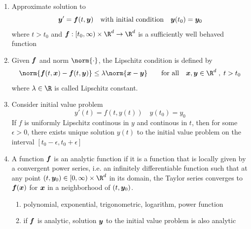 \documentclass[11pt]{article}
\begin{document}
\subsection{}


\begin{enumerate}
    \item {} Approximate solution to 
    \[
        \by' = \bf ( t, \by)
        \quad \text{with initial condition} \quad 
        \by ( t_0 ) = \by_0    
    \]
    where $t > t_0$ and $\bf: [t_0, \infty) \times \R^d \to \R^d$ is a sufficiently well behaved function
    \item {} Given $\bf$ and norm $\norm{\cdot}$, the Lipschitz condition is defined by 
    \[
        \norm{
            \bf(t, \bx) - \bf(t, \by)
        } \leq \lambda \norm{\bx - \by}
        \quad \quad
        \text{for all}
        \quad \bx, \by \in \R^d \;,\; t> t_0
    \]
    where $\lambda \in \R$ is called Lipschitz constant. 
    \item {} Consider initial value problem 
    \[
        y'(t) = f(t, y(t))
        \quad
        y(t_0) = y_0
    \]
    If $f$ is uniformly Lipschitz continous in $y$ and continous in $t$, then for some $\epsilon > 0$, there exists unique solution $y(t)$ to the initial value problem on the interval $[t_0 - \epsilon, t_0 + \epsilon]$ 
    \item {} A function $\bf$ is an analytic function if it is a function that is locally given by a convergent power series, i.e. an infinitely differentiable function such that at any point $(t,\by_0) \in [0, \infty)\times \R^d$ in its domain, the Taylor series converges to $\bf(\bx)$ for $\bx$ in a neighborhood of $(t,\by_0)$.
    \begin{enumerate}
        \item {} polynomial, exponential, trigonometric, logarithm, power function
        \item {} if $\bf$ is analytic, solution $\by$ to the initial value problem is also analytic
    \end{enumerate}
\end{enumerate}


\subsection{}
\end{document}

